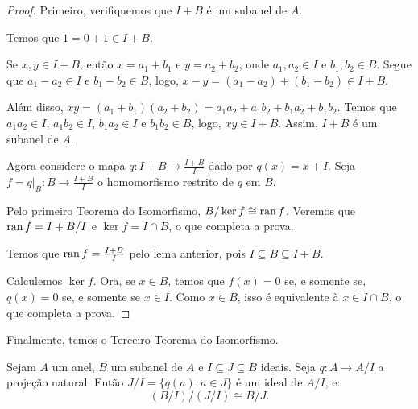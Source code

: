 \begin{proof}
    Primeiro, verifiquemos que $I+B$ é um subanel de $A$.

    Temos que $1=0+1 \in I+B$.

    Se $x, y \in I+B$, então $x=a_1+b_1$ e $y=a_2+b_2$, onde $a_1, a_2 \in I$ e $b_1, b_2 \in B$.
    Segue que $a_1-a_2 \in I$ e $b_1-b_2 \in B$, logo, $x-y=(a_1-a_2)+(b_1-b_2) \in I+B$.

    Além disso, $xy=(a_1+b_1)(a_2+b_2)=a_1a_2+a_1b_2+b_1a_2+b_1b_2$.
    Temos que $a_1a_2\in I$, $a_1b_2\in I$, $b_1a_2\in I$ e $b_1b_2\in B$, logo, $xy\in I+B$.
    Assim, $I+B$ é um subanel de $A$.

    Agora considere o mapa $q:I+B\rightarrow \frac{I+B}{I}$ dado por $q(x)=x+I$. Seja $f=q|_B:B\rightarrow \frac{I+B}{I}$ o homomorfismo restrito de $q$ em $B$.

    Pelo primeiro Teorema do Isomorfismo, $B/\ker f \cong \operatorname{ran} f$.
    Veremos que $\operatorname{ran} f=I+B/I$ e $\ker f=I\cap B$, o que completa a prova.

    Temos que $\operatorname{ran} f = \frac{I+B}{I}$ pelo lema anterior, pois $I\subseteq B\subseteq I+B$.

    Calculemos $\ker f$. Ora, se $x \in B$, temos que $f(x)=0$ se, e somente se, $q(x)=0$ se, e somente se $x\in I$.
    Como $x\in B$, isso é equivalente à $x \in I\cap B$, o que completa a prova.
\end{proof}
Finalmente, temos o Terceiro Teorema do Isomorfismo.
\begin{theorem}
    Sejam $A$ um anel, $B$ um subanel de $A$ e $I\subseteq J\subseteq B$ ideais.
    Seja $q:A\rightarrow A/I$ a projeção natural.
    Então $J/I=\{q(a):a \in J\}$ é um ideal de $A/I$, e:
    \[
         (B/I)/(J/I) \cong B/J.
    \]
\end{theorem}
